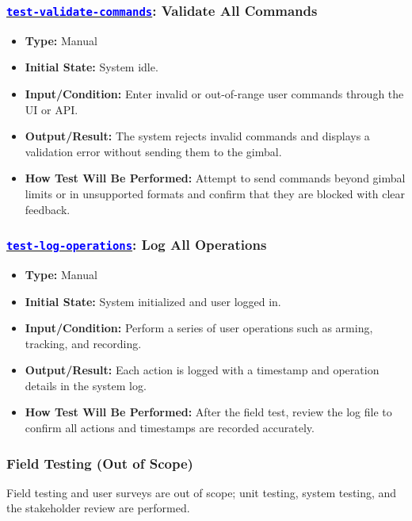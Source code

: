 \documentclass[12pt, titlepage]{article}
\newcommand{\tid}[1]{\hyperlink{tid:#1}{\textcolor{blue}{\texttt{#1}}}}
\begin{document}
\subsubsection*{\tid{test-validate-commands}: Validate All Commands}
\begin{itemize}
  \item \textbf{Type:} Manual
  \item \textbf{Initial State:} System idle.
  \item \textbf{Input/Condition:} Enter invalid or out-of-range user commands through the UI or API.
  \item \textbf{Output/Result:} The system rejects invalid commands and displays a validation error without sending them to the gimbal.
  \item \textbf{How Test Will Be Performed:} Attempt to send commands beyond gimbal limits or in unsupported formats and confirm that they are blocked with clear feedback.
\end{itemize}

\subsubsection*{\tid{test-log-operations}: Log All Operations}
\begin{itemize}
  \item \textbf{Type:} Manual
  \item \textbf{Initial State:} System initialized and user logged in.
  \item \textbf{Input/Condition:} Perform a series of user operations such as arming, tracking, and recording.
  \item \textbf{Output/Result:} Each action is logged with a timestamp and operation details in the system log.
  \item \textbf{How Test Will Be Performed:} After the field test, review the log file to confirm all actions and timestamps are recorded accurately.
\end{itemize}

\subsubsection{Field Testing (Out of Scope)}

Field testing and user surveys are out of scope; unit testing, system testing,
and the stakeholder review are performed.
\end{document}

